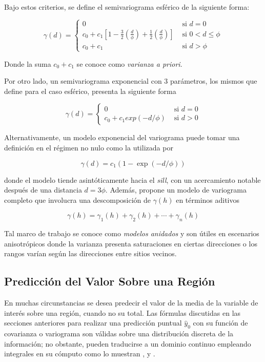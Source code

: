 \documentclass[14pt]{extarticle}
\begin{document}
Bajo estos criterios, se define el semivariograma esférico de la siguiente forma:

\begin{equation}
	\gamma (d) = \begin{cases}
	0 & \textrm{ si } d = 0 \\
	c_0 + c_1\left[1 - \frac{3}{2}\left(\frac{d}{\phi}\right) + \frac{1}{2} \left(\frac{d}{\phi}\right)\right] & \textrm{ si } 0 < d \leq \phi \\
	c_0 + c_1 & \textrm{ si } d > \phi
	\end{cases}
\end{equation}

\noindent Donde la suma $c_0 + c_1$ se conoce como \textit{varianza a priori}\cite{Brus.2022}. 

Por otro lado, un semivariograma exponencial con 3 parámetros, los mismos que \cite{Brus.2022} define para el caso esférico, presenta la siguiente forma

\begin{equation}
	\gamma(d) = \begin{cases}
	0 & \textrm{ si } d = 0\\
	c_0 + c_1 exp(-d/\phi) & \textrm{ si } d > 0
	\end{cases}
\end{equation}

Alternativamente, un modelo exponencial del variograma puede tomar una definición en el régimen no nulo como la utilizada por \cite{Hohn.1993}

$$\gamma(d) = c_1(1 - \exp(-d/\phi))$$

\noindent donde el modelo tiende asintóticamente hacia el \textit{sill}, con un acercamiento notable después de una distancia $d = 3\phi$. Además, \cite{Hohn.1993} propone un modelo de variograma completo que involucra una descomposición de $\gamma(h)$ en términos aditivos

$$\gamma(h) = \gamma_1(h) + \gamma_2(h) + \cdots + \gamma_n(h)$$

Tal marco de trabajo se conoce como \textit{modelos anidados} y son útiles en escenarios anisotrópicos donde la varianza presenta saturaciones en ciertas direcciones o los rangos varían según las direcciones entre sitios vecinos\cite{Hohn.1993}. 

\subsection{Predicción del Valor Sobre una Región}
En muchas circunstancias se desea predecir el valor de la  media de la variable de interés sobre una región, cuando no su total\cite{Thompson.2012}. Las fórmulas discutidas en las secciones anteriores para realizar una predicción puntual $\hat{y}_0$ con su función de covarianza o variograma son válidas sobre una distribución discreta de la información\cite{Thompson.2012}; no obstante, pueden traducirse a un dominio continuo empleando integrales en su cómputo como lo muestran \cite{Cressie.1986}, \cite{Grondona.1991} y \cite{Thompson.2012}.  
\end{document}
